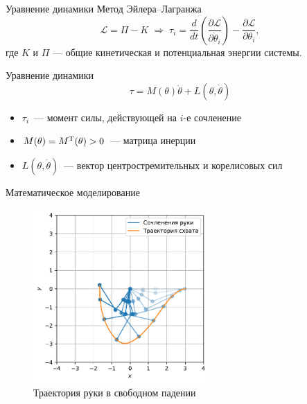     \begin{frame}{Уравнение динамики}
        Метод Эйлера--Лагранжа
        $$
            \mathcal{L} = \Pi - K
            \;\Longrightarrow\;
            \tau_i
            =
              \frac{d}{dt}\left(\frac{\partial \mathcal{L}}{\partial \dot \theta_i}\right)
            - \frac{\partial \mathcal{L}}{\partial \theta_i},
        $$
        где $K$ и $\Pi$ --- общие кинетическая и потенциальная энергии системы.
        \vfill
        \begin{block}{Уравнение динамики}
            $$
                \tau = M(\theta)\ddot\theta + L(\theta, \dot\theta)
            $$
            \begin{itemize}
                \item $\tau_i$~--- момент силы, действующей на $i$-е сочленение
                \item $M(\theta)=M^{\textnormal{T}}(\theta)>0$~--- матрица инерции
                \item $L(\theta, \dot\theta)$~--- вектор центростремительных и корелисовых сил
            \end{itemize}
        \end{block}
    \end{frame}

    \begin{frame}{Математическое моделирование}
        \begin{figure}
            \includegraphics[width=0.6\textwidth]{img/model/pendulum.pdf}
            \caption{Траектория руки в свободном падении}
        \end{figure}
    \end{frame}

